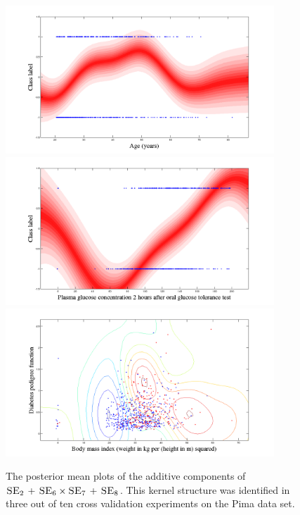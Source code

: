 \documentclass[a4paper,12pt ]{report}
\newcommand{\kernplus}{ \, + \,}
\begin{document}
\begin{figure}

\caption{The posterior mean plots of the additive components of $\SE_2 \kernplus \SE_6 \times \SE_7 \kernplus \SE_8$. This kernel structure was identified in three out of ten cross validation experiments on the Pima data set.}

\begin{center}

\includegraphics[trim=0cm 0cm 0cm 0cm, width=0.9\textwidth]{figures/pima/age.png} %
\includegraphics[trim=0cm 0cm 0cm 0cm, width=0.9\textwidth]{figures/pima/glucose.png} %
\includegraphics[trim=0cm 0cm 0cm 0cm, width=0.9\textwidth]{figures/pima/pedigreebmi.png} %

\end{center}

\end{figure}
\end{document}

